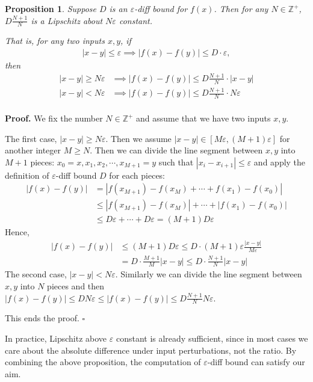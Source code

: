 \documentclass[letterpaper]{article} %
\newtheorem{proposition}{Proposition}
\begin{document}
	
	\begin{proposition}
		
		Suppose $D$ is an $\varepsilon$-diff bound for $f(x)$. Then for any $N\in\mathbb{Z}^+$, $D\frac{N+1}{N}$ is a Lipschitz about $N\varepsilon$ constant.
		
		That is, for any two inputs $x,y$, if \begin{align*}
			|x-y|\leq \varepsilon \implies |f(x)-f(y)| \leq D \cdot \varepsilon,
		\end{align*} then 	 \begin{align*}
			|x-y|\geq N\varepsilon &\implies |f(x)-f(y)| \leq D\frac{N+1}{N} \cdot |x-y|\\
			|x-y|<N\varepsilon &\implies |f(x)-f(y)| \leq D\frac{N+1}{N} \cdot N\varepsilon\\
		\end{align*}
	\end{proposition}
	
	\textbf{Proof.} We fix the number $N\in\mathbb{Z}^+$ and assume that we have two inputs $x, y$.
	
	The first case, $|x-y|\geq N\varepsilon$. Then we assume $|x-y| \in [M\varepsilon ,  (M+1)\varepsilon]$ for another integer $M\geq N$. Then we can divide the line segment between $x, y$ into $M+1$ pieces: $x_0 = x, x_1, x_2, \cdots, x_{M+1} = y$ such that $|x_i-x_{i+1}| \leq \varepsilon$ and apply the definition of $\varepsilon$-diff bound $D$ for each pieces:\begin{align*}
		|f(x)-f(y)| &= |f(x_{M+1})-f(x_M)+\cdots+f(x_1)-f(x_0)|\\
		&\leq |f(x_{M+1})-f(x_M)|+\cdots+|f(x_1)-f(x_0)|\\
		&\leq D\varepsilon + \cdots +D\varepsilon = (M+1)D\varepsilon
	\end{align*}
	Hence,\begin{align*}
		|f(x)-f(y)| &\leq (M+1)D\varepsilon \leq D\cdot (M+1)\varepsilon \frac{|x-y|}{M\varepsilon}\\
		&= D\cdot\frac{M+1}{M} |x-y|	\leq   D\cdot\frac{N+1}{N} |x-y|		
	\end{align*}
	The second case, $|x-y|< N\varepsilon$. Similarly we can divide the line segment between $x, y$ into $N$ pieces and then $|f(x)-f(y)|\leq D N\varepsilon\leq |f(x)-f(y)|\leq D \frac{N+1}{N} N\varepsilon$.
	
	This ends the proof.
	\hfill $\square$
	
	In practice, Lipschitz above $\varepsilon$ constant is already sufficient, since in most cases we care about the absolute difference under input perturbations, not the ratio. By combining the above proposition, the computation of $\varepsilon$-diff bound can satisfy our aim.
	
\end{document}
